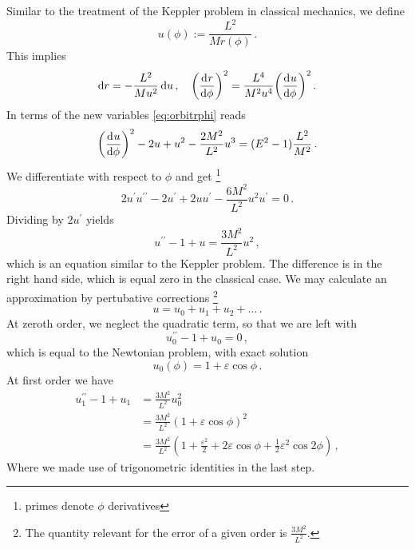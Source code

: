 Similar to the treatment of the Keppler problem in classical mechanics, we
define
\begin{equation}
u(\phi):=\frac{L^2}{Mr(\phi)}\,.
\end{equation}
This implies
\begin{equation}
\dif r=-\frac{L^2}{Mu^2}\dif u\,,\quad
\left(\dod{r}{\phi}\right)^2=\frac{L^4}{M^2u^4}\left(\dod{u}{\phi}\right)^2\,.
\end{equation} 
In terms of the new variables \eqref{eq:orbitrphi} reads
\begin{equation}
\left(\dod{u}{\phi}\right)^2-2u+u^2-\frac{2M^2}{L^2}u^3=(E^2-1)\frac{L^2}{M^2}\,.
\end{equation}
We differentiate with respect to $\phi$ and get 
\footnote{primes denote $\phi$
derivatives}
\begin{equation}
2u^\prime u^{\prime\prime}-2u^\prime+2u
u^{\prime}-\frac{6M^2}{L^2}u^2u^\prime=0\,.
\end{equation}
Dividing by $2u^\prime$ yields
\begin{equation}
u^{\prime\prime}-1+u=\frac{3M^2}{L^2}u^2\,,
\end{equation}
which is an equation similar to the Keppler problem. The difference is in the
right hand side, which is equal zero in the classical case.
We may calculate an approximation by pertubative corrections
\footnote{The quantity relevant for the error of a given order is
$\frac{3M^2}{L^2}$.}
\begin{equation}
u=u_0+u_1+u_2+\dots\,.
\end{equation}
At zeroth order, we neglect the quadratic term, so that we are left with
\begin{equation}
u_0^{\prime\prime}-1+u_0=0\,,
\end{equation}
which is equal to the Newtonian problem, with exact solution
\begin{equation}
u_0(\phi)=1+\varepsilon\cos\phi\,.
\end{equation}
At first order we have
\begin{equation}
\begin{split}
u_1^{\prime\prime}-1+u_1&=\frac{3M^2}{L^2}u_0^2\\
&=\frac{3M^2}{L^2}\left(1+\varepsilon\cos\phi\right)^2\\\
&=\frac{3M^2}{L^2}\left(1+\frac{\varepsilon^2}{2}+2\varepsilon\cos\phi+\frac{1}{2}\varepsilon^2\cos
2\phi\right)\,,
\end{split}
\end{equation}
Where we made use of trigonometric identities in the last step. 
